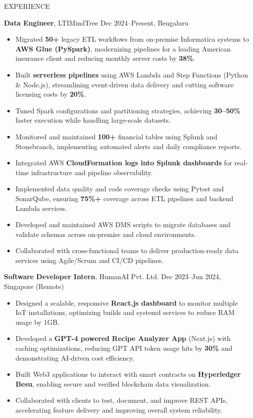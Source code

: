 \documentclass[10pt]{resume}
\begin{document}
\begin{rSection}{EXPERIENCE}

\textbf{Data Engineer}, LTIMindTree \hfill Dec 2024–Present, Bengaluru
\begin{itemize}
  \item Migrated \textbf{50+} legacy ETL workflows from on-premise Informatica systems to \textbf{AWS Glue (PySpark)}, modernizing pipelines for a leading American insurance client and reducing monthly server costs by \textbf{38\%}.
  \item Built \textbf{serverless pipelines} using AWS Lambda and Step Functions (Python \& Node.js), streamlining event-driven data delivery and cutting software licensing costs by \textbf{20\%}.
  \item Tuned Spark configurations and partitioning strategies, achieving \textbf{30–50\%} faster execution while handling large-scale datasets.
  \item Monitored and maintained \textbf{100+} financial tables using Splunk and Stonebranch, implementing automated alerts and daily compliance reports.
  \item Integrated AWS \textbf{CloudFormation logs into Splunk dashboards} for real-time infrastructure and pipeline observability.
  \item Implemented data quality and code coverage checks using Pytest and SonarQube, ensuring \textbf{75\%+} coverage across ETL pipelines and backend Lambda services.
  \item Developed and maintained AWS DMS scripts to migrate databases and validate schemas across on-premise and cloud environments.
  \item Collaborated with cross-functional teams to deliver production-ready data services using Agile/Scrum and CI/CD pipelines.
\end{itemize}

\textbf{Software Developer Intern}, HumanAI Pvt. Ltd. \hfill Dec 2023–Jun 2024, Singapore (Remote)
\begin{itemize}
  \item Designed a scalable, responsive \textbf{React.js dashboard} to monitor multiple IoT installations, optimizing builds and systemd services to reduce RAM usage by 1GB.
  \item Developed a \textbf{GPT-4 powered Recipe Analyzer App} (Next.js) with caching optimizations, reducing   GPT API token usage hits by \textbf{30\%} and demonstrating AI-driven cost efficiency.
  \item Built Web3 applications to interact with smart contracts on \textbf{Hyperledger Besu}, enabling secure and verified blockchain data visualization.
  \item Collaborated with clients to test, document, and improve REST APIs, accelerating feature delivery and improving overall system reliability.
\end{itemize}



\end{rSection}
\end{document}
